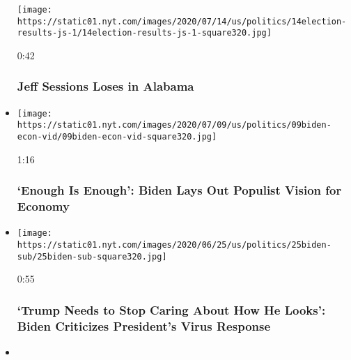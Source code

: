 \begin{itemize}
  \texttt{[image: https://static01.nyt.com/images/2020/07/14/us/politics/14election-results-js-1/14election-results-js-1-square320.jpg]}

  0:42

  \hypertarget{jeff-sessions-loses-in-alabama}{%
  \subsubsection{Jeff Sessions Loses in
  Alabama}\label{jeff-sessions-loses-in-alabama}}
\item
  \href{https://www.nytimes.com/video/us/politics/100000007231038/live-biden-speech-scranton.html?action=click\&module=video-series-bar\&region=header\&pgtype=Article\&playlistId=video/2020-Elections}{}

  \texttt{[image: https://static01.nyt.com/images/2020/07/09/us/politics/09biden-econ-vid/09biden-econ-vid-square320.jpg]}

  1:16

  \hypertarget{enough-is-enough-biden-lays-out-populist-vision-for-economy}{%
  \subsubsection{`Enough Is Enough': Biden Lays Out Populist Vision for
  Economy}\label{enough-is-enough-biden-lays-out-populist-vision-for-economy}}
\item
  \href{https://www.nytimes.com/video/us/100000007210595/biden-trump-coronavirus.html?action=click\&module=video-series-bar\&region=header\&pgtype=Article\&playlistId=video/2020-Elections}{}

  \texttt{[image: https://static01.nyt.com/images/2020/06/25/us/politics/25biden-sub/25biden-sub-square320.jpg]}

  0:55

  \hypertarget{trump-needs-to-stop-caring-about-how-he-looks-biden-criticizes-presidents-virus-response}{%
  \subsubsection{`Trump Needs to Stop Caring About How He Looks': Biden
  Criticizes President's Virus
  Response}\label{trump-needs-to-stop-caring-about-how-he-looks-biden-criticizes-presidents-virus-response}}
\item
  \href{https://www.nytimes.com/video/us/100000007205944/kentucky-primary-voting.html?action=click\&module=video-series-bar\&region=header\&pgtype=Article\&playlistId=video/2020-Elections}{}


\end{itemize}
